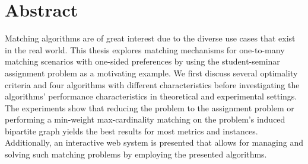 \section*{Abstract}\label{sec:abstract}

Matching algorithms are of great interest due to the diverse use cases that exist in the real world. This thesis explores matching mechanisms for one-to-many matching scenarios with one-sided preferences by using the student-seminar assignment problem as a motivating example. We first discuss several optimality criteria and four algorithms with different characteristics before investigating the algorithms' performance characteristics in theoretical and experimental settings. The experiments show that reducing the problem to the assignment problem or performing a min-weight max-cardinality matching on the problem's induced bipartite graph yields the best results for most metrics and instances. Additionally, an interactive web system is presented that allows for managing and solving such matching problems by employing the presented algorithms. 